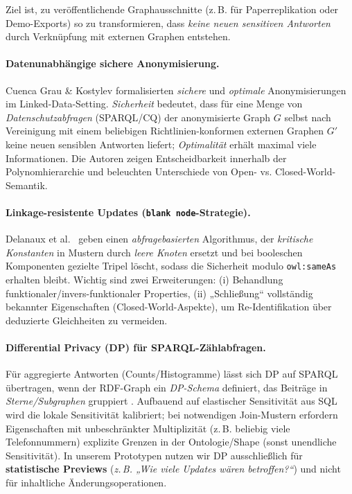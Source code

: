 Ziel ist, zu veröffentlichende Graphausschnitte (z.\,B. für Paperreplikation oder Demo-Exports) so zu transformieren, dass \emph{keine neuen sensitiven Antworten} durch Verknüpfung mit externen Graphen entstehen.

\paragraph{Datenunabhängige sichere Anonymisierung.}
Cuenca Grau \& Kostylev \cite{cuenca_kostylev_logical_foundations_ppdp_ld} formalisierten \emph{sichere} und \emph{optimale} Anonymisierungen im Linked-Data-Setting. \emph{Sicherheit} bedeutet, dass für eine Menge von \emph{Datenschutzabfragen} (SPARQL/CQ) der anonymisierte Graph $G$ selbst nach Vereinigung mit einem beliebigen Richtlinien-konformen externen Graphen $G'$ keine neuen sensiblen Antworten liefert; \emph{Optimalität} erhält maximal viele Informationen. Die Autoren zeigen Entscheidbarkeit innerhalb der Polynomhierarchie und beleuchten Unterschiede von Open- vs. Closed-World-Semantik.

\paragraph{Linkage-resistente Updates (\texttt{blank node}-Strategie).}
Delanaux et al.\ \cite{delanaux_rdf_graph_anonymization_linkage} geben einen \emph{abfragebasierten} Algorithmus, der \emph{kritische Konstanten} in Mustern durch \emph{leere Knoten} ersetzt und bei booleschen Komponenten gezielte Tripel löscht, sodass die Sicherheit modulo \texttt{owl:sameAs} erhalten bleibt. Wichtig sind zwei Erweiterungen:
(i) Behandlung funktionaler/invers-funktionaler Properties, (ii) „Schließung“ vollständig bekannter Eigenschaften (Closed-World-Aspekte), um Re-Identifikation über deduzierte Gleichheiten zu vermeiden. 

\paragraph{Differential Privacy (DP) für SPARQL-Zählabfragen.}
Für aggregierte Antworten (Counts/Histogramme) lässt sich DP auf SPARQL übertragen, wenn der RDF-Graph ein \emph{DP-Schema} definiert, das Beiträge in \emph{Sterne/Subgraphen} gruppiert \cite{buil_aranda_dp_sparql}. Aufbauend auf elastischer Sensitivität aus SQL wird die lokale Sensitivität kalibriert; bei notwendigen Join-Mustern erfordern Eigenschaften mit unbeschränkter Multiplizität (z.\,B. beliebig viele Telefonnummern) explizite Grenzen in der Ontologie/Shape (sonst unendliche Sensitivität). In unserem Prototypen nutzen wir DP ausschließlich für \textbf{statistische Previews} (\emph{z.\,B. „Wie viele Updates wären betroffen?“}) und nicht für inhaltliche Änderungsoperationen.

